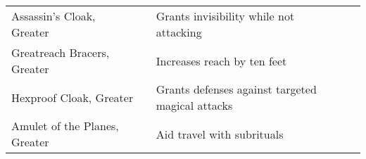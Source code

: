 \begin{longtabuwrapper}
\begin{longtabu}{l l X l}
Assassin's Cloak, Greater &  & Grants invisibility while not attacking & \pageref{item:Assassin's Cloak, Greater} \\
Greatreach Bracers, Greater &  & Increases reach by ten feet & \pageref{item:Greatreach Bracers, Greater} \\
Hexproof Cloak, Greater &  & Grants  defenses against targeted magical attacks & \pageref{item:Hexproof Cloak, Greater} \\
Amulet of the Planes, Greater &  & Aid travel with  subrituals & \pageref{item:Amulet of the Planes, Greater} \\
\end{longtabu}
\end{longtabuwrapper}
